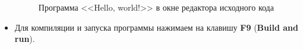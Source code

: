 \begin{itemize}
\begin{figure}[H]
        \caption{Программа <<Hello, world!>> в окне редактора исходного кода}
        \label{CodeBlocks-5}
    \end{figure}
    \item Для компиляции и запуска программы нажимаем на клавишу \textbf{F9} (\textbf{Build and run}).
\end{itemize}
